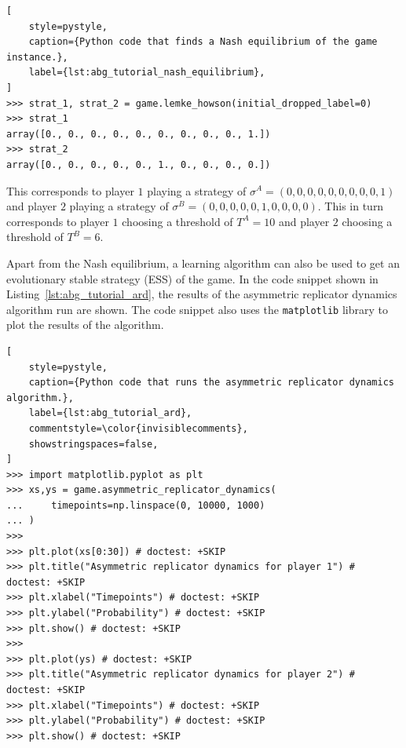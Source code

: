 \begin{lstlisting}[
    style=pystyle,
    caption={Python code that finds a Nash equilibrium of the game instance.},
    label={lst:abg_tutorial_nash_equilibrium},
]
>>> strat_1, strat_2 = game.lemke_howson(initial_dropped_label=0)
>>> strat_1
array([0., 0., 0., 0., 0., 0., 0., 0., 0., 1.])
>>> strat_2
array([0., 0., 0., 0., 0., 1., 0., 0., 0., 0.])

\end{lstlisting}

This corresponds to player \(1\) playing a strategy of
\(\sigma^A = (0, 0, 0, 0, 0, 0, 0, 0, 0, 1)\) and player \(2\) playing a
strategy of \(\sigma^B = (0, 0, 0, 0, 0, 1, 0, 0, 0, 0)\).
This in turn corresponds to player \(1\) choosing a threshold of \(T^A = 10\)
and player \(2\) choosing a threshold of \(T^B = 6\).

Apart from the Nash equilibrium, a learning algorithm can also be used to get
an evolutionary stable strategy (ESS) of the game.
In the code snippet shown in Listing~\ref{lst:abg_tutorial_ard}, the results
of the asymmetric replicator dynamics algorithm run are shown.
The code snippet also uses the \texttt{matplotlib} library to plot the
results of the algorithm.


\begin{lstlisting}[
    style=pystyle,
    caption={Python code that runs the asymmetric replicator dynamics algorithm.},
    label={lst:abg_tutorial_ard},
    commentstyle=\color{invisiblecomments},
    showstringspaces=false,
]
>>> import matplotlib.pyplot as plt
>>> xs,ys = game.asymmetric_replicator_dynamics(
...     timepoints=np.linspace(0, 10000, 1000)
... )
>>>
>>> plt.plot(xs[0:30]) # doctest: +SKIP
>>> plt.title("Asymmetric replicator dynamics for player 1") # doctest: +SKIP
>>> plt.xlabel("Timepoints") # doctest: +SKIP
>>> plt.ylabel("Probability") # doctest: +SKIP
>>> plt.show() # doctest: +SKIP
>>>
>>> plt.plot(ys) # doctest: +SKIP
>>> plt.title("Asymmetric replicator dynamics for player 2") # doctest: +SKIP
>>> plt.xlabel("Timepoints") # doctest: +SKIP
>>> plt.ylabel("Probability") # doctest: +SKIP
>>> plt.show() # doctest: +SKIP
    
\end{lstlisting}

